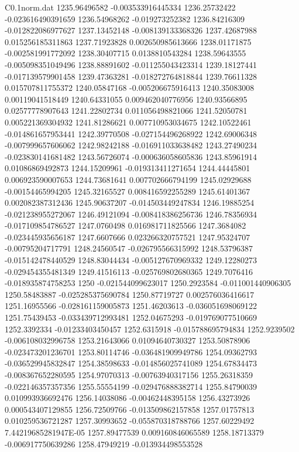 \begin{filecontents}{C0.1norm.dat}
1235.96496582		-0.003533916445334
1236.25732422		-0.023616490391659
1236.54968262		-0.019273252382
1236.84216309		-0.012822086977627
1237.13452148		-0.008139133368326
1237.42687988		0.015256185311863
1237.71923828		0.002650985613666
1238.01171875		-0.002581991772092
1238.30407715		0.0138810543284
1238.59643555		-0.005098351049496
1238.88891602		-0.011255043423314
1239.18127441		-0.017139579901458
1239.47363281		-0.018272764818844
1239.76611328		0.015707811755372
1240.05847168		-0.005206675916413
1240.35083008		0.00119041518449
1240.64331055		0.009462040776956
1240.93566895		0.02577778907643
1241.22802734		0.011056498821066
1241.52050781		0.005221369304932
1241.81286621		0.007710953034675
1242.10522461		-0.014861657953441
1242.39770508		-0.027154496268922
1242.69006348		-0.007999657606062
1242.98242188		-0.016911033638482
1243.27490234		-0.023830141681482
1243.56726074		-0.000636058605836
1243.85961914		0.01086869492873
1244.15209961		-0.019313411271654
1244.44445801		0.006923590007653
1244.73681641		0.007702666794199
1245.02929688		-0.00154465994205
1245.32165527		0.008416592255289
1245.61401367		0.002082387312436
1245.90637207		-0.014503449247834
1246.19885254		-0.021238955272067
1246.49121094		-0.008418386256736
1246.78356934		-0.017109854786527
1247.0760498		0.016981711825566
1247.3684082		-0.023445935656187
1247.6607666		0.023266320757521
1247.95324707		-0.00795204717791
1248.24560547		-0.026795566315992
1248.53796387		-0.015142478440529
1248.83044434		-0.005127670969332
1249.12280273		-0.029454355481349
1249.41516113		-0.025769802680365
1249.7076416		-0.018935874758253
1250		-0.021544099623017
1250.2923584		-0.011001440906305
1250.58483887		-0.025285375690784
1250.87719727		0.002576036416617
1251.16955566		-0.028161159005873
1251.46203613		-0.036051698069122
1251.75439453		-0.033439712993481
1252.04675293		-0.019769077510669
1252.3392334		-0.01233403450457
1252.6315918		-0.015788695794834
1252.9239502		-0.006108032996758
1253.21643066		0.01094640730327
1253.50878906		-0.023473201236701
1253.80114746		-0.036481909949786
1254.09362793		-0.036529945832847
1254.38598633		-0.014856025741089
1254.67834473		-0.008367652280595
1254.97070313		-0.00763940317156
1255.26318359		-0.022146357357356
1255.55554199		-0.029476888382714
1255.84790039		0.010993936692476
1256.14038086		-0.00462448395158
1256.43273926		0.000543407129855
1256.72509766		-0.013509862157858
1257.01757813		0.010259536721287
1257.30993652		-0.055870318788766
1257.60229492		7.44219685281947E-05
1257.89477539		0.009160846065589
1258.18713379		-0.006917750639286
1258.47949219		-0.013934498553528

\end{filecontents}
